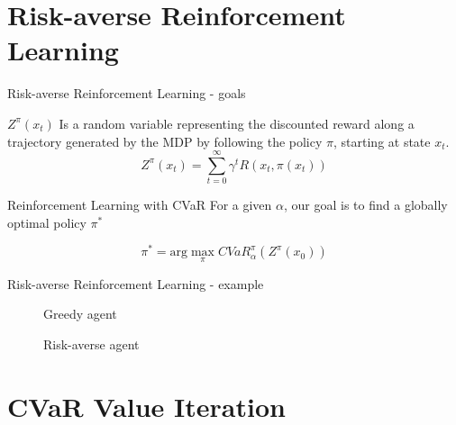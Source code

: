 \documentclass{beamer}
\begin{document}

\section{Risk-averse Reinforcement Learning}

\begin{frame}{Risk-averse Reinforcement Learning - goals}
\begin{definition}
$Z^\pi(x_t)$ Is a random variable representing the discounted reward along a trajectory generated by the MDP by following the policy $\pi$, starting at state $x_t$.
$$Z^\pi(x_{t})=\sum_{t=0}^\infty \gamma^tR(x_t,\pi(x_t))$$
\end{definition}

\begin{block}{Reinforcement Learning with CVaR}
For a given $\alpha$, our goal is to find a globally optimal policy $\pi^*$

$$\pi^* = \text{arg}\max_\pi CVaR^\pi_\alpha(Z^\pi(x_0))$$
\end{block}
\end{frame}


\begin{frame}{Risk-averse Reinforcement Learning - example}
\begin{figure}
    \centering
    \begin{minipage}{0.5\textwidth}
        \centering
        \caption{Greedy agent}
    \end{minipage}\hfill
    \begin{minipage}{0.5\textwidth}
        \centering
        \caption{Risk-averse agent}
    \end{minipage}
\end{figure}
\end{frame}


\section{CVaR Value Iteration}
\end{document}
